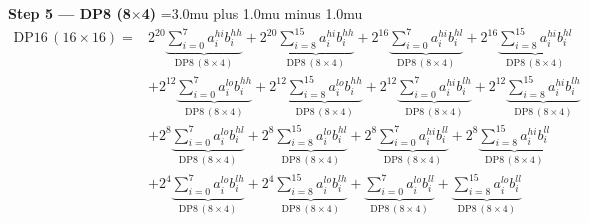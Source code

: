 \documentclass[fleqn]{article}
\newcommand{\DPop}[3]{\mathrm{DP#1}\,(#2\!\times\!#3)}
\begin{document}
\noindent\textbf{Step 5 --- DP8 (8$\times$4)}
{\medmuskip=3.0mu plus 1.0mu minus 1.0mu
\begin{align*}
\DPop{16}{16}{16} = {}
  & 2^{20} \underbrace{\sum_{i=0}^{7} a_i^{hi} b_i^{hh}}_{\DPop{8}{8}{4}}
  + 2^{20} \underbrace{\sum_{i=8}^{15} a_i^{hi} b_i^{hh}}_{\DPop{8}{8}{4}}
  + 2^{16} \underbrace{\sum_{i=0}^{7} a_i^{hi} b_i^{hl}}_{\DPop{8}{8}{4}}
  + 2^{16} \underbrace{\sum_{i=8}^{15} a_i^{hi} b_i^{hl}}_{\DPop{8}{8}{4}} \\[1em]
  & + 2^{12} \underbrace{\sum_{i=0}^{7} a_i^{lo} b_i^{hh}}_{\DPop{8}{8}{4}}
  + 2^{12} \underbrace{\sum_{i=8}^{15} a_i^{lo} b_i^{hh}}_{\DPop{8}{8}{4}}
  + 2^{12} \underbrace{\sum_{i=0}^{7} a_i^{hi} b_i^{lh}}_{\DPop{8}{8}{4}}
  + 2^{12} \underbrace{\sum_{i=8}^{15} a_i^{hi} b_i^{lh}}_{\DPop{8}{8}{4}} \\[1em]
  & + 2^{8} \underbrace{\sum_{i=0}^{7} a_i^{lo} b_i^{hl}}_{\DPop{8}{8}{4}}
  + 2^{8} \underbrace{\sum_{i=8}^{15} a_i^{lo} b_i^{hl}}_{\DPop{8}{8}{4}}
  + 2^{8} \underbrace{\sum_{i=0}^{7} a_i^{hi} b_i^{ll}}_{\DPop{8}{8}{4}}
  + 2^{8} \underbrace{\sum_{i=8}^{15} a_i^{hi} b_i^{ll}}_{\DPop{8}{8}{4}} \\[1em]
  & + 2^{4} \underbrace{\sum_{i=0}^{7} a_i^{lo} b_i^{lh}}_{\DPop{8}{8}{4}}
  + 2^{4} \underbrace{\sum_{i=8}^{15} a_i^{lo} b_i^{lh}}_{\DPop{8}{8}{4}}
  + \underbrace{\sum_{i=0}^{7} a_i^{lo} b_i^{ll}}_{\DPop{8}{8}{4}}
  + \underbrace{\sum_{i=8}^{15} a_i^{lo} b_i^{ll}}_{\DPop{8}{8}{4}}
\end{align*}
}
\end{document}
